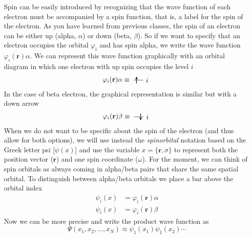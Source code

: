 \documentclass[../Main/notes.tex]{subfiles}
\begin{document}
Spin can be easily introduced by recognizing that the wave function of each electron must be accompanied by a spin function, that is, a label for the spin of the electron.
As you have learned from previous classes, the spin of an electron can be either up (alpha, $\alpha$) or down (beta, $\beta$).
So if we want to specify that an electron occupies the orbital $\varphi_i$ and has spin alpha, we write the wave function $\varphi_i(\mathbf{r}) \alpha$.
We can represent this wave function graphically with an orbital diagram in which one electron with up spin occupies the level $i$
\begin{equation}
\varphi_i(\mathbf{r}) \alpha
\equiv \;
\begin{tikzpicture}[baseline={([yshift=-.5ex]current bounding box.center)},]
    \draw (0,0.5) -- (0.5,0.5);
    \draw[thick,->,>=stealth] (0.15,0.325) -- (0.15,0.675);
    \draw (0.7,0.5) node{$i$};
\end{tikzpicture}
\end{equation}
In the case of beta electron, the graphical representation is similar but with a down arrow
\begin{equation}
\varphi_i(\mathbf{r}) \beta
\equiv \;
\begin{tikzpicture}[baseline={([yshift=-.5ex]current bounding box.center)},]
    \draw (0,0.5) -- (0.5,0.5);
    \draw[thick,<-,>=stealth] (0.35,0.325) -- (0.35,0.675);
    \draw (0.7,0.5) node{$i$};
\end{tikzpicture}
\end{equation}
When we do not want to be specific about the spin of the electron (and thus allow for both options), we will use instead the \emph{spinorbital} notation based on the Greek letter psi [$\psi(x)$] and use the variable $x = \{ \mathbf{r},\sigma\}$ to represent both the position vector ($\mathbf{r}$) and one spin coordinate ($\omega$).
For the moment, we can think of spin orbitals as always coming in alpha/beta pairs that share the same spatial orbital. To distinguish between alpha/beta orbitals we place a bar above the orbital index
\begin{align}
\psi_i(x) & = \varphi_i(\mathbf{r}) \alpha \\
\psi_{\bar{i}}(x) & = \varphi_i(\mathbf{r}) \beta
\end{align}
Now we can be more precise and write the product wave function as
\begin{equation}
\label{eq:hartree_prod_spin}
\Psi(x_1, x_2, \ldots, x_N) \approx \psi_1(x_1) \psi_{\bar{1}}(x_2) \cdots
\end{equation}
\end{document}
